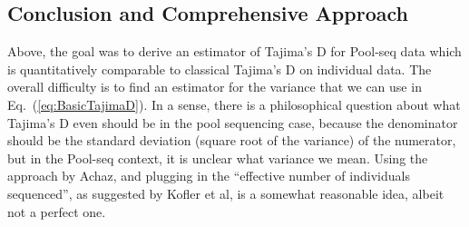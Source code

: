 \documentclass[a4paper,fontsize=9pt,DIV=14]{scrartcl}
\newcounter{todo}
\newcommand\todo[1]{}
\newcommand\toolname{\textsc}
\newcommand\eqnref[1]{Eq.~(\ref{#1})}
\begin{document}





\subsection{Conclusion and Comprehensive Approach}
\label{supp:sec:TajimaD:sub:RealDeal}

Above, the goal was to derive an estimator of Tajima's D for Pool-seq data which is quantitatively comparable to classical Tajima's D on individual data.  The overall difficulty is to find an estimator for the variance that we can use in \eqnref{eq:BasicTajimaD}.  
In a sense, there is a philosophical question about what Tajima's D even should be in the pool sequencing case, because the denominator should be the standard deviation (square root of the variance) of the numerator, but in the Pool-seq context, it is unclear what variance we mean.  Using the approach by Achaz, and plugging in the ``effective number of individuals sequenced'', as suggested by Kofler et al, is a somewhat reasonable idea, albeit not a perfect one. 

\end{document}
